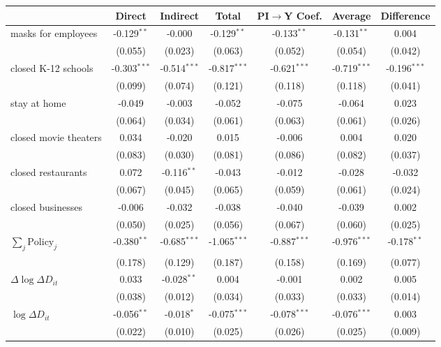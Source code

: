 
\begin{tabular}{lccccc|>{}c}
\toprule
  & Direct & Indirect & Total & PI$\to$Y Coef. & Average & Difference\\
\midrule
masks for employees & -0.129$^{**}$ & -0.000 & -0.129$^{**}$ & -0.133$^{**}$ & -0.131$^{**}$ & 0.004\\
 & (0.055) & (0.023) & (0.063) & (0.052) & (0.054) & (0.042)\\
closed K-12 schools & -0.303$^{***}$ & -0.514$^{***}$ & -0.817$^{***}$ & -0.621$^{***}$ & -0.719$^{***}$ & -0.196$^{***}$\\
 & (0.099) & (0.074) & (0.121) & (0.118) & (0.118) & (0.041)\\
stay at home & -0.049 & -0.003 & -0.052 & -0.075 & -0.064 & 0.023\\
 & (0.064) & (0.034) & (0.061) & (0.063) & (0.061) & (0.026)\\
closed movie theaters & 0.034 & -0.020 & 0.015 & -0.006 & 0.004 & 0.020\\
 & (0.083) & (0.030) & (0.081) & (0.086) & (0.082) & (0.037)\\
closed restaurants & 0.072 & -0.116$^{**}$ & -0.043 & -0.012 & -0.028 & -0.032\\
 & (0.067) & (0.045) & (0.065) & (0.059) & (0.061) & (0.024)\\
closed businesses & -0.006 & -0.032 & -0.038 & -0.040 & -0.039 & 0.002\\
 & (0.050) & (0.025) & (0.056) & (0.067) & (0.060) & (0.025)\\
$\sum_j \mathrm{Policy}_j$ & -0.380$^{**}$ & -0.685$^{***}$ & -1.065$^{***}$ & -0.887$^{***}$ & -0.976$^{***}$ & -0.178$^{**}$\\
 & (0.178) & (0.129) & (0.187) & (0.158) & (0.169) & (0.077)\\
$\Delta \log \Delta D_{it}$ & 0.033 & -0.028$^{**}$ & 0.004 & -0.001 & 0.002 & 0.005\\
 & (0.038) & (0.012) & (0.034) & (0.033) & (0.033) & (0.014)\\
$\log \Delta D_{it}$ & -0.056$^{**}$ & -0.018$^{*}$ & -0.075$^{***}$ & -0.078$^{***}$ & -0.076$^{***}$ & 0.003\\
 & (0.022) & (0.010) & (0.025) & (0.026) & (0.025) & (0.009)\\
\bottomrule
\end{tabular}
